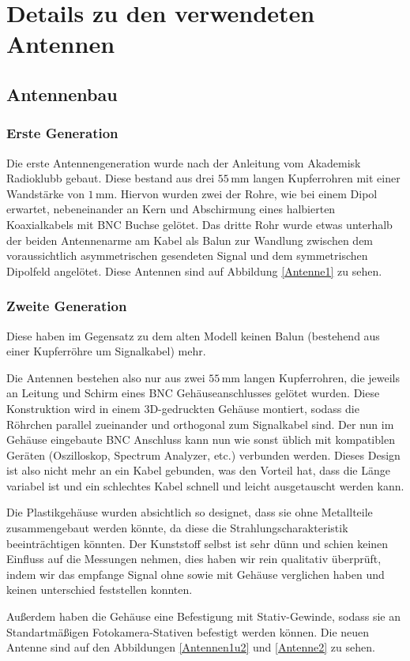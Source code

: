 \documentclass[titlepage,11pt,a4paper,ngerman]{article}
\begin{document}


\section{Details zu den verwendeten Antennen}

\subsection{Antennenbau}

\subsubsection{Erste Generation}

Die erste Antennengeneration wurde nach der Anleitung \cite{Antennenbauanleitung} vom Akademisk Radioklubb gebaut. Diese bestand aus drei $55\,$mm langen Kupferrohren mit einer Wandstärke von $1\,$mm. Hiervon wurden zwei der Rohre, wie bei einem Dipol erwartet, nebeneinander an Kern und Abschirmung eines halbierten Koaxialkabels mit BNC Buchse gelötet. Das dritte Rohr wurde etwas unterhalb der beiden Antennenarme am Kabel als Balun zur Wandlung zwischen dem voraussichtlich asymmetrischen gesendeten Signal und dem symmetrischen Dipolfeld angelötet. Diese Antennen sind auf Abbildung \ref{Antenne1} zu sehen.

\subsubsection{Zweite Generation}

 Diese haben im Gegensatz zu dem alten Modell keinen Balun (bestehend aus einer Kupferröhre um Signalkabel) mehr.\par
Die Antennen bestehen also nur aus zwei $55\,$mm langen Kupferrohren, die jeweils an Leitung und Schirm eines BNC Gehäuseanschlusses gelötet wurden. Diese Konstruktion wird in einem 3D-gedruckten Gehäuse montiert, sodass die Röhrchen parallel zueinander und orthogonal zum Signalkabel sind. Der nun im Gehäuse eingebaute BNC Anschluss kann nun wie sonst üblich mit kompatiblen Geräten (Oszilloskop, Spectrum Analyzer, etc.) verbunden werden. Dieses Design ist also nicht mehr an ein Kabel gebunden, was den Vorteil hat, dass die Länge variabel ist und ein schlechtes Kabel schnell und leicht ausgetauscht werden kann.\par
Die Plastikgehäuse wurden absichtlich so designet, dass sie ohne Metallteile zusammengebaut werden könnte, da diese die Strahlungscharakteristik beeinträchtigen könnten. Der Kunststoff selbst ist sehr dünn und schien keinen Einfluss auf die Messungen nehmen, dies haben wir rein qualitativ überprüft, indem wir das empfange Signal ohne sowie mit Gehäuse verglichen haben und keinen unterschied feststellen konnten.\par
Außerdem haben die Gehäuse eine Befestigung mit Stativ-Gewinde, sodass sie an Standartmäßigen Fotokamera-Stativen befestigt werden können. Die neuen Antenne sind auf den Abbildungen \ref{Antennen1u2} und \ref{Antenne2} zu sehen.
\end{document}
